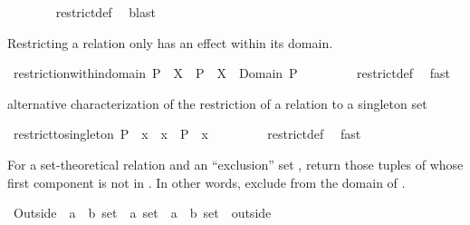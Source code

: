 \begin{isabellebody}
%
\isadelimproof
\ \ \ \ \ \ %
\endisadelimproof
%
\isatagproof
{}\isamarkupfalse%
\ restrict{\isacharunderscore}def\ \isamarkupfalse%
\ blast%
\endisatagproof
{\isafoldproof}%
%
\isadelimproof
%
\endisadelimproof
%
\begin{isamarkuptext}%
Restricting a relation only has an effect within its domain.%
\end{isamarkuptext}%
\isamarkuptrue%
\isamarkupfalse%
\ restriction{\isacharunderscore}within{\isacharunderscore}domain{\isacharcolon}\ {\isachardoublequoteopen}P\ {\isacharbar}{\isacharbar}\ X\ {\isacharequal}\ P\ {\isacharbar}{\isacharbar}\ {\isacharparenleft}X\ {\isasyminter}\ {\isacharparenleft}Domain\ P{\isacharparenright}{\isacharparenright}{\isachardoublequoteclose}\ \isanewline
%
\isadelimproof
\ \ \ \ \ \ %
\endisadelimproof
%
\isatagproof
{}\isamarkupfalse%
\ restrict{\isacharunderscore}def\ \isamarkupfalse%
\ fast%
\endisatagproof
{\isafoldproof}%
%
\isadelimproof
%
\endisadelimproof
%
\begin{isamarkuptext}%
alternative characterization of the restriction of a relation to a singleton set%
\end{isamarkuptext}%
\isamarkuptrue%
\isamarkupfalse%
\ restrict{\isacharunderscore}to{\isacharunderscore}singleton{\isacharcolon}\ {\isachardoublequoteopen}P\ {\isacharbar}{\isacharbar}\ {\isacharbraceleft}x{\isacharbraceright}\ {\isacharequal}\ {\isacharbraceleft}x{\isacharbraceright}\ {\isasymtimes}\ {\isacharparenleft}P\ {\isacharbackquote}{\isacharbackquote}\ {\isacharbraceleft}x{\isacharbraceright}{\isacharparenright}{\isachardoublequoteclose}\ \isanewline
%
\isadelimproof
\ \ \ \ \ \ %
\endisadelimproof
%
\isatagproof
{}\isamarkupfalse%
\ restrict{\isacharunderscore}def\ \isamarkupfalse%
\ fast%
\endisatagproof
{\isafoldproof}%
%
\isadelimproof
%
\endisadelimproof
%
\isamarkuptrue%
%
\begin{isamarkuptext}%
For a set-theoretical relation  and an ``exclusion'' set , return those
  tuples of  whose first component is not in .  In other words, exclude 
  from the domain of .%
\end{isamarkuptext}%
\isamarkuptrue%
\isamarkupfalse%
\ Outside\ {\isacharcolon}{\isacharcolon}\ {\isachardoublequoteopen}{\isacharparenleft}{\isacharprime}a\ {\isasymtimes}\ {\isacharprime}b{\isacharparenright}\ set\ {\isasymRightarrow}\ {\isacharprime}a\ set\ {\isasymRightarrow}\ {\isacharparenleft}{\isacharprime}a\ {\isasymtimes}\ {\isacharprime}b{\isacharparenright}\ set{\isachardoublequoteclose}\ {\isacharparenleft}\ {\isachardoublequoteopen}outside{\isachardoublequoteclose}\ {}{}{\isacharparenright}\isanewline

\end{isabellebody}
